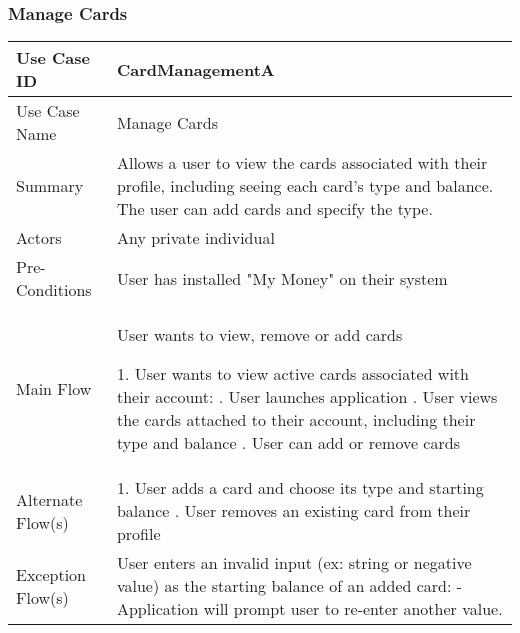 \documentclass[12pt]{article}
\begin{document}
\subsubsection{ Manage Cards } \label{uc:1}
\begin{center}

\begin{tabular}{| p{5cm} | p{10cm} |}

\hline



Use Case ID  & CardManagementA\\

\hline

Use Case Name  & Manage Cards\\

\hline

Summary  & Allows a user to view the cards associated with their profile, including seeing each card's type and balance. The user can add cards and specify the type. \\

\hline

Actors  & Any private individual\\

\hline

Pre-Conditions &  User has installed "My Money" on their system \\


\hline

Main Flow & User wants to view, remove or add cards\newline

1.	User wants to view active cards associated with their account: \newline
2.  User launches  application \newline
3.  User views the cards attached to their account, including their type and balance \newline
4.	User can add or remove cards\\

\hline

Alternate Flow(s) & 1. User adds a card and choose its type and starting balance \newline
2. User removes an existing card from their profile \\
\hline
Exception Flow(s) & User enters an invalid input (ex: string or negative value) as the starting balance of an added card:\newline
- Application will prompt user to re-enter another value.\\
\hline



\end{tabular}

\end{center}
\end{document}

